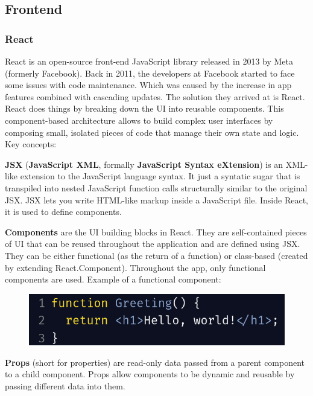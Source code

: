 \subsection{Frontend}

\subsubsection{React}

\par React is an open-source front-end JavaScript library released in 2013 by Meta (formerly Facebook). Back in 2011, the developers at Facebook started to face some issues with code maintenance. Which was caused by the increase in app features combined with cascading updates. The solution they arrived at is React. \cite{reactHistory} React does things by breaking down the UI into reusable components. This component-based architecture allows to build complex user interfaces by composing small, isolated pieces of code that manage their own state and logic. Key concepts:

\par \textbf{JSX} (\textbf{JavaScript XML}, formally \textbf{JavaScript Syntax eXtension}) is an XML-like extension to the JavaScript language syntax. \cite{jsx} It just a syntatic sugar that is transpiled into nested JavaScript function calls structurally similar to the original JSX. JSX lets you write HTML-like markup inside a JavaScript file. Inside React, it is used to define components.

\par \textbf{Components} are the UI building blocks in React. They are self-contained pieces of UI that can be reused throughout the application and are defined using JSX. They can be either functional (as the return of a function) or class-based (created by extending React.Component). Throughout the app, only functional components are used. Example of a functional component:

\begin{figure}[!ht]
    \centering
    \includegraphics[width=1\linewidth]{react-component-example.png}
\end{figure}

\par \textbf{Props} (short for properties) are read-only data passed from a parent component to a child component. Props allow components to be dynamic and reusable by passing different data into them.


